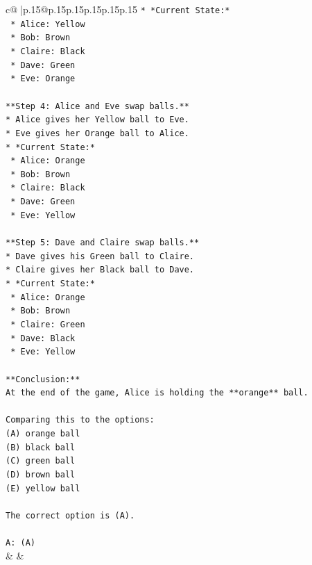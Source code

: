 \documentclass{article}
\begin{document}
{\begin{supertabular}{c@{$\;$}|p{.15\linewidth}@{}p{.15\linewidth}p{.15\linewidth}p{.15\linewidth}p{.15\linewidth}p{.15\linewidth}}
{{{\texttt{*   *Current State:*} \\
\texttt{    *   Alice: Yellow} \\
\texttt{    *   Bob: Brown} \\
\texttt{    *   Claire: Black} \\
\texttt{    *   Dave: Green} \\
\texttt{    *   Eve: Orange} \\
\\ 
\texttt{**Step 4: Alice and Eve swap balls.**} \\
\texttt{*   Alice gives her Yellow ball to Eve.} \\
\texttt{*   Eve gives her Orange ball to Alice.} \\
\texttt{*   *Current State:*} \\
\texttt{    *   Alice: Orange} \\
\texttt{    *   Bob: Brown} \\
\texttt{    *   Claire: Black} \\
\texttt{    *   Dave: Green} \\
\texttt{    *   Eve: Yellow} \\
\\ 
\texttt{**Step 5: Dave and Claire swap balls.**} \\
\texttt{*   Dave gives his Green ball to Claire.} \\
\texttt{*   Claire gives her Black ball to Dave.} \\
\texttt{*   *Current State:*} \\
\texttt{    *   Alice: Orange} \\
\texttt{    *   Bob: Brown} \\
\texttt{    *   Claire: Green} \\
\texttt{    *   Dave: Black} \\
\texttt{    *   Eve: Yellow} \\
\\ 
\texttt{**Conclusion:**} \\
\texttt{At the end of the game, Alice is holding the **orange** ball.} \\
\\ 
\texttt{Comparing this to the options:} \\
\texttt{(A) orange ball} \\
\texttt{(B) black ball} \\
\texttt{(C) green ball} \\
\texttt{(D) brown ball} \\
\texttt{(E) yellow ball} \\
\\ 
\texttt{The correct option is (A).} \\
\\ 
\texttt{A: (A)} \\
            }
        }
    }
    & & \\ \\


\end{supertabular}}
\end{document}
